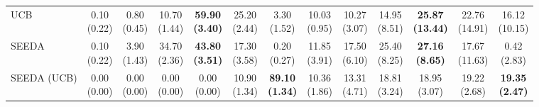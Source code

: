 \begin{table}[H]
{\begin{tabular}{l|cccccc|cccccc}
UCB & \makecell{0.10 \\ (0.22)} & \makecell{0.80 \\ (0.45)} & {\cellcolor[HTML]{C8E6C9}} \makecell{10.70 \\ (1.44)} & \bfseries \makecell{59.90 \\ (3.40)} & \makecell{25.20 \\ (2.44)} & \makecell{3.30 \\ (1.52)} & \makecell{10.03 \\ (0.95)} & \makecell{10.27 \\ (3.07)} & {\cellcolor[HTML]{C8E6C9}} \makecell{14.95 \\ (8.51)} & \bfseries \makecell{25.87 \\ (13.44)} & \makecell{22.76 \\ (14.91)} & \makecell{16.12 \\ (10.15)} \\
SEEDA & \makecell{0.10 \\ (0.22)} & \makecell{3.90 \\ (1.43)} & {\cellcolor[HTML]{C8E6C9}} \makecell{34.70 \\ (2.36)} & \bfseries \makecell{43.80 \\ (3.51)} & \makecell{17.30 \\ (3.58)} & \makecell{0.20 \\ (0.27)} & \makecell{11.85 \\ (3.91)} & \makecell{17.50 \\ (6.10)} & {\cellcolor[HTML]{C8E6C9}} \makecell{25.40 \\ (8.25)} & \bfseries \makecell{27.16 \\ (8.65)} & \makecell{17.67 \\ (11.63)} & \makecell{0.42 \\ (2.83)} \\
SEEDA (UCB) & \makecell{0.00 \\ (0.00)} & \makecell{0.00 \\ (0.00)} & {\cellcolor[HTML]{C8E6C9}} \makecell{0.00 \\ (0.00)} & \makecell{0.00 \\ (0.00)} & \makecell{10.90 \\ (1.34)} & \bfseries \makecell{89.10 \\ (1.34)} & \makecell{10.36 \\ (1.86)} & \makecell{13.31 \\ (4.71)} & {\cellcolor[HTML]{C8E6C9}} \makecell{18.81 \\ (3.24)} & \makecell{18.95 \\ (3.07)} & \makecell{19.22 \\ (2.68)} & \bfseries \makecell{19.35 \\ (2.47)} \\

\end{tabular}}
\end{table}
